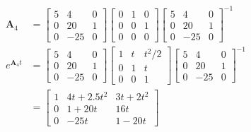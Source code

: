 \begin{itemize}
 \begin{align*}
  \mathbf{A}_4 &= \begin{bmatrix}
                   5 & 4 & 0\\
                   0 & 20 & 1\\
                   0 & -25 & 0
                  \end{bmatrix}
                  \begin{bmatrix}
                   0 & 1 & 0\\
                   0 & 0 & 1\\
                   0 & 0 & 0
                  \end{bmatrix}
                  \begin{bmatrix}
                   5 & 4 & 0\\
                   0 & 20 & 1\\
                   0 & -25 & 0
                  \end{bmatrix}^{-1}\\
e^{\mathbf{A}_4 t} &= \begin{bmatrix}
                   5 & 4 & 0\\
                   0 & 20 & 1\\
                   0 & -25 & 0
                  \end{bmatrix}
                  \begin{bmatrix}
                   1 & t & t^2/2\\
                   0 & 1 & t\\
                   0 & 0 & 1
                  \end{bmatrix}
                  \begin{bmatrix}
                   5 & 4 & 0\\
                   0 & 20 & 1\\
                   0 & -25 & 0
                  \end{bmatrix}^{-1}\\
                &= \begin{bmatrix}
                    1 & 4t +2.5 t^2 & 3t +2t^2\\
                    0 & 1+20t & 16t \\
                    0 & -25 t & 1-20t
                   \end{bmatrix}
 \end{align*}
\end{itemize}
